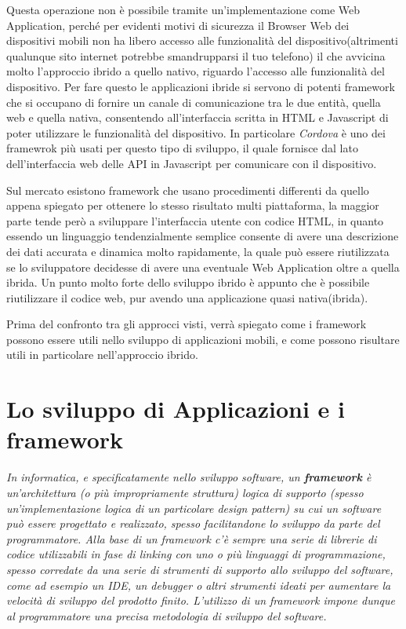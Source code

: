Questa operazione non è possibile tramite un'implementazione come Web Application, perché per evidenti motivi di sicurezza il Browser Web dei dispositivi mobili non ha libero accesso alle funzionalità del dispositivo(altrimenti qualunque sito internet potrebbe smandrupparsi il tuo telefono) il che avvicina molto l'approccio ibrido a quello nativo, riguardo l'accesso alle funzionalità del dispositivo. Per fare questo le applicazioni ibride si servono di potenti framework che si occupano di fornire un canale di comunicazione tra le due entità, quella web e quella nativa, consentendo all'interfaccia scritta in HTML e Javascript di poter utilizzare le funzionalità del dispositivo. In particolare \emph{Cordova} è uno dei framewrok più usati per questo tipo di sviluppo, il quale fornisce dal lato dell'interfaccia web delle API in Javascript per comunicare con il dispositivo.

Sul mercato esistono framework che usano procedimenti differenti da quello appena spiegato per ottenere lo stesso risultato multi piattaforma, la maggior parte tende però a sviluppare l'interfaccia utente con codice
HTML, in quanto essendo un linguaggio tendenzialmente semplice consente di avere una descrizione dei dati accurata e dinamica molto rapidamente, la quale può essere riutilizzata se lo sviluppatore decidesse di avere una eventuale Web Application oltre a quella ibrida. Un punto molto forte dello sviluppo ibrido è appunto che è possibile riutilizzare il codice web, pur avendo una applicazione quasi nativa(ibrida).  

Prima del confronto tra gli approcci visti, verrà spiegato come i framework possono essere utili nello sviluppo di applicazioni mobili, e come possono risultare utili in particolare nell'approccio ibrido.

\section{Lo sviluppo di Applicazioni e i framework}

\textit{In informatica, e specificatamente nello sviluppo software, un \textbf{framework} è un'architettura (o più impropriamente struttura) logica di supporto (spesso un'implementazione logica di un particolare design pattern) su cui un software può essere progettato e realizzato, spesso facilitandone lo sviluppo da parte del programmatore. Alla base di un framework c'è sempre una serie di librerie di codice utilizzabili in fase di linking con uno o più linguaggi di programmazione, spesso corredate da una serie di strumenti di supporto allo sviluppo del software, come ad esempio un IDE, un debugger o altri strumenti ideati per aumentare la velocità di sviluppo del prodotto finito. L'utilizzo di un framework impone dunque al programmatore una precisa metodologia di sviluppo del software.}\\
\hspace*{\fill}\cite{wiki:framework}

